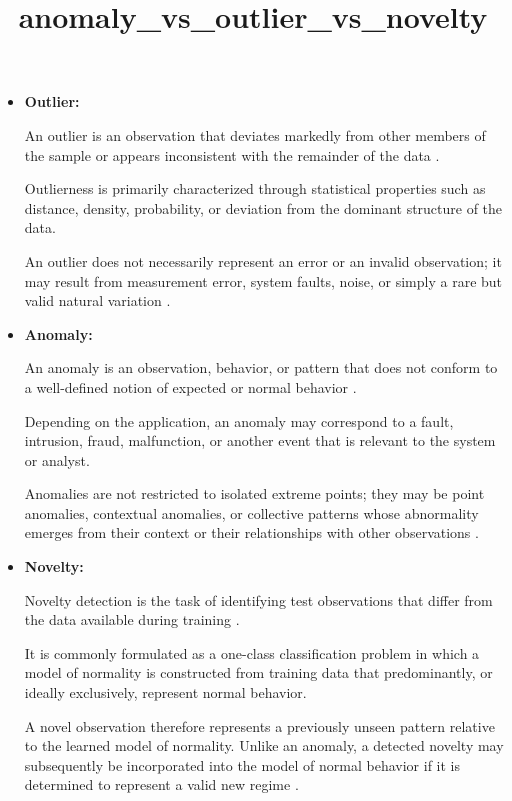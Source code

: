 \documentclass[a4paper]{article}
\title{anomaly\_vs\_outlier\_vs\_novelty}
\date{}
\begin{document}
    \maketitle
    \begin{itemize}

        \item \textbf{Outlier:}

        An outlier is an observation that deviates markedly from other members
        of the sample or appears inconsistent with the remainder of the data
        \cite{hodge-austin-2004-a-survey-of-outlier-detection-methodologies}.

        Outlierness is primarily characterized through statistical properties
        such as distance, density, probability, or deviation from the dominant
        structure of the data.

        An outlier does not necessarily represent an error or an invalid
        observation; it may result from measurement error, system faults, noise,
        or simply a rare but valid natural variation
        \cite{hodge-austin-2004-a-survey-of-outlier-detection-methodologies}.

        \item \textbf{Anomaly:}

        An anomaly is an observation, behavior, or pattern that does not conform
        to a well-defined notion of expected or normal behavior
        \cite{chandola-banerjee-kumar-2009-anomaly-detection-a-survey}.

        Depending on the application, an anomaly may correspond to a fault,
        intrusion, fraud, malfunction, or another event that is relevant to the
        system or analyst.

        Anomalies are not restricted to isolated extreme points; they may be
        point anomalies, contextual anomalies, or collective patterns whose
        abnormality emerges from their context or their relationships with other
        observations
        \cite{chandola-banerjee-kumar-2009-anomaly-detection-a-survey}.

        \item \textbf{Novelty:}

        Novelty detection is the task of identifying test observations that
        differ from the data available during training
        \cite{pimentel-clifton-clifton-tarassenko-2014-a-review-of-novelty-detection}.

        It is commonly formulated as a one-class classification problem in which a model of normality is constructed from training data that predominantly, or ideally exclusively, represent normal behavior.

        A novel observation therefore represents a previously unseen pattern relative to the learned model of normality. Unlike an anomaly, a detected
        novelty may subsequently be incorporated into the model of normal behavior if it is determined to represent a valid new regime \cite{pimentel-clifton-clifton-tarassenko-2014-a-review-of-novelty-detection,
        chandola-banerjee-kumar-2009-anomaly-detection-a-survey}.

    \end{itemize}

    
    
\end{document}
